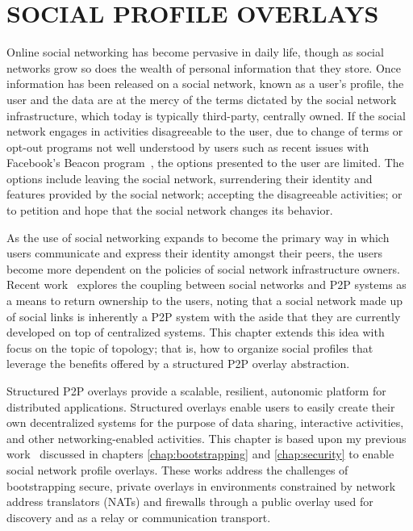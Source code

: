 \chapter{SOCIAL PROFILE OVERLAYS}
\label{chap:spo}

Online social networking has become pervasive in daily life, though as social
networks grow so does the wealth of personal information that they store.  Once
information has been released on a social network, known as a user's profile,
the user and the data are at the mercy of the terms dictated by the social
network infrastructure, which today is typically third-party, centrally owned.
If the social network engages in activities disagreeable to the user, due to
change of terms or opt-out programs not well understood by users such as recent
issues with Facebook's Beacon program~\cite{facebook_beacon}, the options
presented to the user are limited.  The options include leaving the social
network, surrendering their identity and features provided by the social
network; accepting the disagreeable activities; or to petition and hope that
the social network changes its behavior. 

As the use of social networking expands to become the primary way in which
users communicate and express their identity amongst their peers, the users
become more dependent on the policies of social network infrastructure owners.
Recent work~\cite{p2p_socialnetwork} explores the coupling between social
networks and P2P systems as a means to return ownership to the users, noting
that a social network made up of social links is inherently a P2P system with
the aside that they are currently developed on top of centralized systems.
This chapter extends this idea with focus on the topic of topology; that is,
how to organize social profiles that leverage the benefits offered by a
structured P2P overlay abstraction.

Structured P2P overlays provide a scalable, resilient, autonomic platform for
distributed applications.  Structured overlays enable users to easily create
their own decentralized systems for the purpose of data sharing, interactive
activities, and other networking-enabled activities.  This chapter is based
upon my previous work~\cite{groupvpn, bootstrapping} discussed in chapters
\ref{chap:bootstrapping} and \ref{chap:security} to enable social network
profile overlays.  These works address the challenges of bootstrapping secure,
private overlays in environments constrained by network address translators
(NATs) and firewalls through a public overlay used for discovery and as a relay
or communication transport.  

